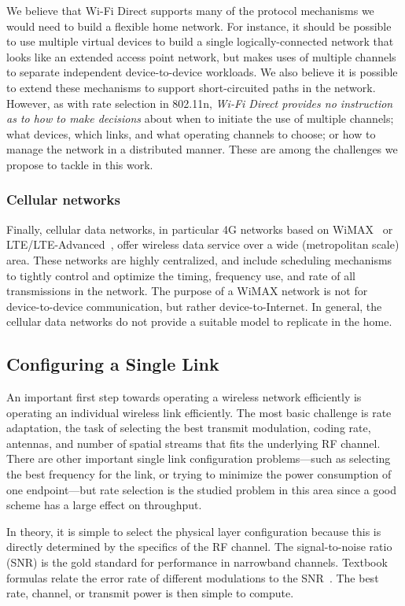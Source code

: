  We believe that Wi-Fi Direct supports many of the protocol mechanisms we would need to build a flexible home network. For instance, it should be possible to use multiple virtual devices to build a single logically-connected network that looks like an extended access point network, but makes uses of multiple channels to separate independent device-to-device workloads. We also believe it is possible to extend these mechanisms to support short-circuited paths in the network. However, as with rate selection in 802.11n, \emph{Wi-Fi Direct provides no instruction as to how to make decisions} about when to initiate the use of multiple channels; what devices, which links, and what operating channels to choose; or how to manage the network in a distributed manner. These are among the challenges we propose to tackle in this work.

\subsubsection{Cellular networks}
Finally, cellular data networks, in particular 4G networks based on WiMAX~\cite{wimax} or LTE/LTE-Advanced~\cite{lte}, offer wireless data service over a wide (metropolitan scale) area. These networks are highly centralized, and include scheduling mechanisms to tightly control and optimize the timing, frequency use, and rate of all transmissions in the network. The purpose of a WiMAX network is not for device-to-device communication, but rather device-to-Internet. In general, the cellular data networks do not provide a suitable model to replicate in the home.

\subsection{Configuring a Single Link}
An important first step towards operating a wireless network efficiently is operating an individual wireless link efficiently. The most basic challenge is rate adaptation, the task of selecting the best transmit modulation, coding rate, antennas, and number of spatial streams that fits the underlying RF channel. There are other important single link configuration problems---such as selecting the best frequency for the link, or trying to minimize the power consumption of one endpoint---but rate selection is the studied problem in this area since a good scheme has a large effect on throughput.

In theory, it is simple to select the physical layer configuration because this is directly determined by the specifics of the RF channel. The signal-to-noise ratio (SNR) is the gold standard for performance in narrowband channels. Textbook formulas relate the error rate of different modulations to the SNR~\cite{Tse}. The best rate, channel, or transmit power is then simple to compute.

